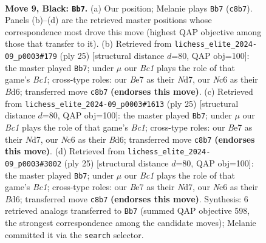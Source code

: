 \documentclass[11pt]{article}
\begin{document}
\begin{figure}[p]\centering
\begin{subfigure}{0.46\textwidth}\centering
\resizebox{\linewidth}{!}{%
\newchessgame
\chessboard[
  setfen={r1bq1rk1/2p1bppp/p1np1n2/1p2p3/4P3/1BN2N1P/PPPP1PP1/R1BQR1K1 b - - 0 9},
  showmover=false,
  pgfstyle=straightmove, color=movearrow, markmove={c8-b7}
]}
\caption{}
\end{subfigure}\hfill
\begin{subfigure}{0.46\textwidth}\centering
\resizebox{\linewidth}{!}{%
\newchessgame
\chessboard[
  setfen={r1b2rk1/2qn1ppp/p1pb1n2/1p2p3/3PP3/1BN2N1P/PPQ2PP1/R1BR2K1 b - - 1 13},
  showmover=false,
  pgfstyle=straightmove, color=movearrow, markmove={c8-b7}
]}
\caption{}
\end{subfigure}
\\[4pt]
\begin{subfigure}{0.46\textwidth}\centering
\resizebox{\linewidth}{!}{%
\newchessgame
\chessboard[
  setfen={r1b2rk1/2qn1ppp/p1pb1n2/1p2p3/3PP3/1BN2N1P/PPQ2PP1/R1BR2K1 b - - 1 13},
  showmover=false,
  pgfstyle=straightmove, color=movearrow, markmove={c8-b7}
]}
\caption{}
\end{subfigure}\hfill
\begin{subfigure}{0.46\textwidth}\centering
\resizebox{\linewidth}{!}{%
\newchessgame
\chessboard[
  setfen={r1b2rk1/2qn1ppp/p1pb1n2/1p2p3/3PP3/1BN2N1P/PPQ2PP1/R1BR2K1 b - - 1 13},
  showmover=false,
  pgfstyle=straightmove, color=movearrow, markmove={c8-b7}
]}
\caption{}
\end{subfigure}
\caption{\textbf{Move 9, Black: \texttt{Bb7}.} (a) Our position; Melanie plays \texttt{Bb7} (\texttt{c8b7}). Panels (b)--(d) are the retrieved master positions whose correspondence most drove this move (highest QAP objective among those that transfer to it). (b) Retrieved from \texttt{lichess\_elite\_2024-09\_p0003\#179} (ply 25) [structural distance $d$=80, QAP obj=100]: the master played \texttt{Bb7}; under $\mu$ our \emph{Bc1} plays the role of that game's \emph{Bc1}; cross-type roles: our \emph{B}e7 as their \emph{N}d7, our \emph{N}c6 as their \emph{B}d6; transferred move \texttt{c8b7} \textbf{(endorses this move)}. (c) Retrieved from \texttt{lichess\_elite\_2024-09\_p0003\#1613} (ply 25) [structural distance $d$=80, QAP obj=100]: the master played \texttt{Bb7}; under $\mu$ our \emph{Bc1} plays the role of that game's \emph{Bc1}; cross-type roles: our \emph{B}e7 as their \emph{N}d7, our \emph{N}c6 as their \emph{B}d6; transferred move \texttt{c8b7} \textbf{(endorses this move)}. (d) Retrieved from \texttt{lichess\_elite\_2024-09\_p0003\#3002} (ply 25) [structural distance $d$=80, QAP obj=100]: the master played \texttt{Bb7}; under $\mu$ our \emph{Bc1} plays the role of that game's \emph{Bc1}; cross-type roles: our \emph{B}e7 as their \emph{N}d7, our \emph{N}c6 as their \emph{B}d6; transferred move \texttt{c8b7} \textbf{(endorses this move)}. Synthesis: 6 retrieved analogs transferred to \texttt{Bb7} (summed QAP objective 598, the strongest correspondence among the candidate moves); Melanie committed it via the \texttt{search} selector.}
\label{fig:thought-m17}
\end{figure}
\end{document}
